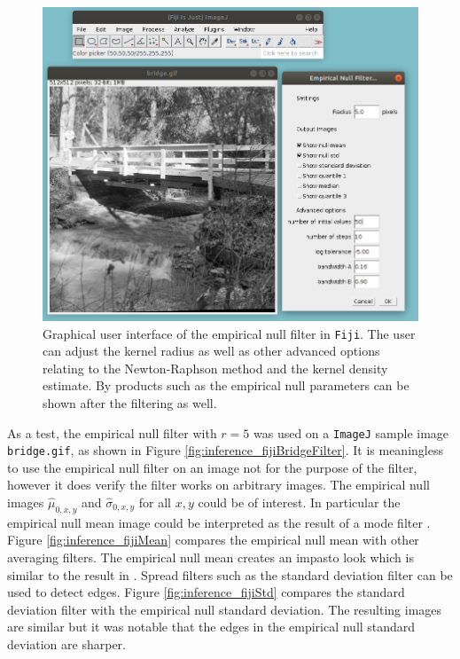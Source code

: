 \begin{figure}
    \centering
    \includegraphics[width=\textwidth]{../figures/inference/fiji/gui.png}
    \caption{Graphical user interface of the empirical null filter in \texttt{Fiji}. The user can adjust the kernel radius as well as other advanced options relating to the Newton-Raphson method and the kernel density estimate. By products such as the empirical null parameters can be shown after the filtering as well.}
    \label{fig:inference_fijiGui}
\end{figure}

As a test, the empirical null filter with $r=5$ was used on a \texttt{ImageJ} sample image \texttt{bridge.gif}, as shown in Figure \ref{fig:inference_fijiBridgeFilter}. It is meaningless to use the empirical null filter on an image not for the purpose of the filter, however it does verify the filter works on arbitrary images. The empirical null images $\widehat{\mu}_{0,x,y}$ and $\widehat{\sigma}_{0,x,y}$ for all ${x,y}$ could be of interest. In particular the empirical null mean image could be interpreted as the result of a mode filter \citep{griffin2000mean}. Figure \ref{fig:inference_fijiMean} compares the empirical null mean with other averaging filters. The empirical null mean creates an impasto look which is similar to the result in \cite{griffin2000mean}. Spread filters such as the standard deviation filter can be used to detect edges. Figure \ref{fig:inference_fijiStd} compares the standard deviation filter with the empirical null standard deviation. The resulting images are similar but it was notable that the edges in the empirical null standard deviation are sharper.

